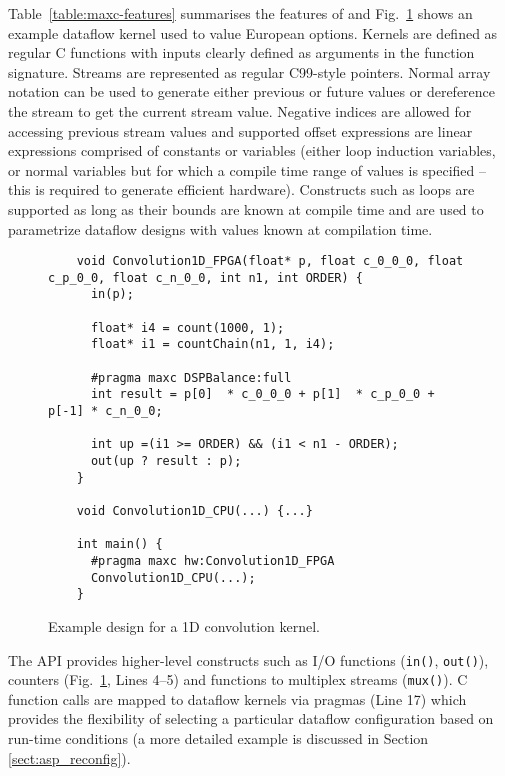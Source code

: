 Table~\ref{table:maxc-features} summarises the features of \MAXC{} and
Fig.~\ref{fig:maxc-1dconv} shows an example dataflow kernel used to
value European options. Kernels are defined as regular C functions
with inputs clearly defined as arguments in the function
signature. Streams are represented as regular C99-style pointers.
Normal array notation can be used to generate either previous or
future values or dereference the stream to get the current stream
value. Negative indices are allowed for accessing previous stream
values and supported offset expressions are linear expressions
comprised of constants or variables (either loop induction variables,
or normal variables but for which a compile time range of values is
specified -- this is required to generate efficient
hardware). Constructs such as loops are supported as long as their
bounds are known at compile time and are used to parametrize dataflow
designs with values known at compilation time.

\lstset{style=MaxC}

\begin{figure}[!h]
  \begin{lstlisting}
    void Convolution1D_FPGA(float* p, float c_0_0_0, float c_p_0_0, float c_n_0_0, int n1, int ORDER) {
      in(p);

      float* i4 = count(1000, 1);
      float* i1 = countChain(n1, 1, i4);

      #pragma maxc DSPBalance:full
      int result = p[0]  * c_0_0_0 + p[1]  * c_p_0_0 + p[-1] * c_n_0_0;

      int up =(i1 >= ORDER) && (i1 < n1 - ORDER);
      out(up ? result : p);
    }

    void Convolution1D_CPU(...) {...}

    int main() {
      #pragma maxc hw:Convolution1D_FPGA
      Convolution1D_CPU(...);
    }
  \end{lstlisting}
  \caption{Example \MAXC{} design for a 1D convolution kernel.}
  \label{fig:maxc-1dconv}
\end{figure}


The \MAXC{} API provides higher-level constructs such as I/O
functions (\texttt{in()}, \texttt{out()}), counters
(Fig.~\ref{fig:maxc-1dconv}, Lines 4--5) and functions to multiplex
streams (\texttt{mux()}). C function calls are mapped to dataflow
kernels via pragmas (Line 17) which provides the flexibility of
selecting a particular dataflow configuration based on run-time
conditions (a more detailed example is discussed in Section
\ref{sect:asp_reconfig}).
